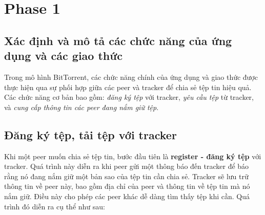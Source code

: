 \section{Phase 1}
\subsection*{Xác định và mô tả các chức năng của ứng dụng và các giao thức}

Trong mô hình BitTorrent, các chức năng chính của ứng dụng và giao thức được thực hiện qua sự phối hợp giữa các peer và tracker để chia sẻ tệp tin hiệu quả. Các chức năng cơ bản bao gồm: \textit{đăng ký tệp} với tracker, \textit{yêu cầu tệp} từ tracker, và \textit{cung cấp thông tin các peer đang nắm giữ tệp}.

\subsection{Đăng ký tệp, tải tệp với tracker}
Khi một peer muốn chia sẻ tệp tin, bước đầu tiên là \textbf{register - đăng ký tệp} với tracker. Quá trình này diễn ra khi peer gửi một thông báo đến tracker để báo rằng nó đang nắm giữ một bản sao của tệp tin cần chia sẻ. Tracker sẽ lưu trữ thông tin về peer này,
bao gồm địa chỉ của peer và thông tin về tệp tin mà nó nắm giữ. Điều này cho phép các peer khác dễ dàng tìm thấy tệp khi cần. Quá trình đó diễn ra cụ thể như sau:
